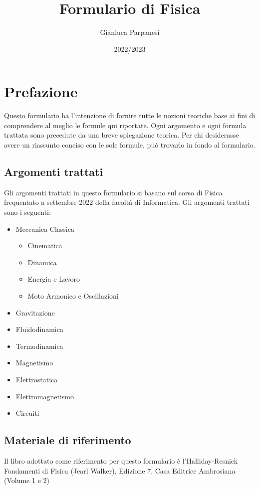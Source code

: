 \documentclass[12pt, a4paper, openany]{book}
\begin{document}
\title{Formulario di Fisica}
\author{Gianluca Parpanesi}
\date{2022/2023}
\maketitle

\section*{Prefazione}

Questo formulario ha l'intenzione di fornire tutte le nozioni teoriche base ai 
fini di comprendere al meglio le formule qui riportate.
Ogni argomento e ogni formula trattata sono precedute da una breve spiegazione
teorica.
Per chi desiderasse avere un riassunto conciso con le sole formule, può 
trovarlo in fondo al formulario.
    \subsection*{Argomenti trattati}
    Gli argomenti trattati in questo formulario si basano sul corso di Fisica 
    frequentato a settembre 2022 della facoltà di Informatica. Gli argomenti
    trattati sono i seguenti:
    \begin{itemize}
        \item Meccanica Classica
        \begin{itemize}
            \item Cinematica 
            \item Dinamica
            \item Energia e Lavoro
            \item Moto Armonico e Oscillazioni
        \end{itemize}
        \item Gravitazione 
        \item Fluidodinamica
        \item Termodinamica
        \item Magnetismo
        \item Elettrostatica
        \item Elettromagnetismo
        \item Circuiti
    \end{itemize}

    \subsection*{Materiale di riferimento}
    Il libro adottato come riferimento per questo formulario è 
    l'Halliday-Resnick Fondamenti di Fisica (Jearl Walker), Edizione 7, Casa 
    Editrice Ambrosiana (Volume 1 e 2)
\end{document}
